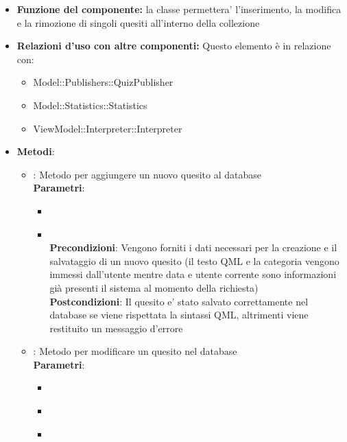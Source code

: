 \begin{itemize}
\item\textbf{Funzione del componente:} la classe permettera' l'inserimento, la modifica e la rimozione di singoli quesiti all'interno della collezione
\item\textbf{Relazioni d'uso con altre componenti:}
Questo elemento è in relazione con:
\begin{itemize}
	\item Model::Publishers::QuizPublisher\\
	\item Model::Statistics::Statistics\\
	\item ViewModel::Interpreter::Interpreter\\
\end{itemize}   
\item\textbf{Metodi}:
	\begin{itemize}
		\item{} : Metodo per aggiungere un nuovo quesito al database\\
		\textbf{Parametri}:
			\begin{itemize}
				\item{}\\
				\item{}\\
				\textbf{Precondizioni}: Vengono forniti i dati necessari per la creazione e il salvataggio di un nuovo quesito (il testo QML e la categoria vengono immessi dall'utente mentre data e utente corrente sono informazioni già presenti il sistema al momento della richiesta)\\
				\textbf{Postcondizioni}: Il quesito e' stato salvato correttamente nel database se viene rispettata la sintassi QML, altrimenti viene restituito un messaggio d'errore\\
			\end{itemize}
		\item{} : Metodo per modificare un quesito nel database\\
		\textbf{Parametri}:
			\begin{itemize}
				\item{}\\
				\item{}\\
				\item{}\\

\end{itemize}
\end{itemize}
\end{itemize}
